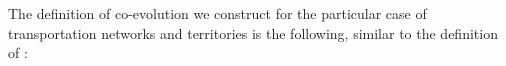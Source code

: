 \documentclass[11pt]{article}
\begin{document}


The definition of co-evolution we construct for the particular case of transportation networks and territories is the following, similar to the definition of \cite{raimbault2018co}:
\end{document}
